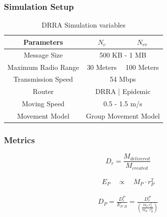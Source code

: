 \documentclass{beamer}
\begin{document}
\begin{frame}
	\frametitle{Simulation Setup}
\begin{table}[!t]
	\renewcommand{\arraystretch}{1.3}
	\caption{DRRA Simulation variables}
	\label{table_parameters}
	\centering
	\begin{tabular}{|c|c|c|}
		\hline
		Parameters         &  $N_{c}$ & $N_{rv}$ \\ \hline
		Message Size       &  \multicolumn{2}{|c|}{500 KB - 1 MB}        \\ \hline
		Maximum Radio Range & 30 Meters  & 100 Meters \\ \hline
		Transmission Speed &  \multicolumn{2}{|c|}{ 54 Mbps   }        \\ \hline
		Router             & \multicolumn{2}{|c|}{ DRRA | Epidemic   } \\ \hline
		Moving Speed       &   \multicolumn{2}{|c|}{0.5 - 1.5 m/s }        \\ \hline
		Movement Model     &   \multicolumn{2}{|c|}{Group Movement Model  }      \\ \hline
	\end{tabular}
\end{table}
\end{frame}
\begin{frame}
	\frametitle{Metrics}
\begin{equation}
	\label{delivery_ratio}
	D_{r} =\frac { { M }_{ delivered } }{ { M }_{ created } } 
\end{equation}

\begin{eqnarray}
	\label{eq:new_energy}
	{ E }_{ P }\quad \propto { \quad M }_{P }\cdot{ r }_{ P }^{ 2 }
\end{eqnarray}	

\begin{eqnarray}
	\label{eq:delivery_performance}
	{ D }_{ P }=\frac { { D }_{ r }^{ P } }{ { E }_{ P,B } } =\frac { { D }_{ r }^{ P } }{ \left( \frac { { M }_{ P }{ \cdot r }_{ P }^{ 2 } }{ { M }_{ B }\cdot { r }_{ B }^{ 2 } }  \right)  } 
\end{eqnarray}

\end{frame}
\end{document}
